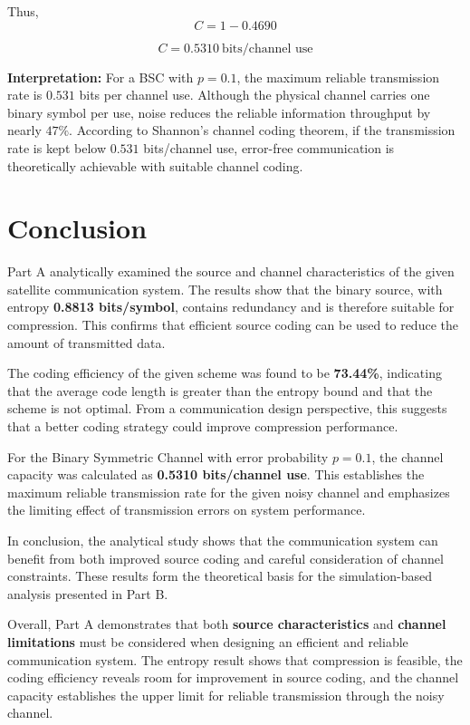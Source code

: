 \documentclass[12pt,a4paper]{article}
\begin{document}
Thus,
\[
C = 1 - 0.4690
\]

\[
\boxed{C = 0.5310\ \text{bits/channel use}}
\]

\begin{blueNote}
\textbf{Interpretation:} For a BSC with $p=0.1$, the maximum reliable transmission rate is $0.531$ bits per channel use. Although the physical channel carries one binary symbol per use, noise reduces the reliable information throughput by nearly $47\%$. According to Shannon's channel coding theorem, if the transmission rate is kept below $0.531$ bits/channel use, error-free communication is theoretically achievable with suitable channel coding.
\end{blueNote}

\section*{Conclusion}

Part A analytically examined the source and channel characteristics of the given satellite communication system. The results show that the binary source, with entropy \textbf{0.8813 bits/symbol}, contains redundancy and is therefore suitable for compression. This confirms that efficient source coding can be used to reduce the amount of transmitted data.

The coding efficiency of the given scheme was found to be \textbf{73.44\%}, indicating that the average code length is greater than the entropy bound and that the scheme is not optimal. From a communication design perspective, this suggests that a better coding strategy could improve compression performance.

For the Binary Symmetric Channel with error probability \textbf{$p = 0.1$}, the channel capacity was calculated as \textbf{0.5310 bits/channel use}. This establishes the maximum reliable transmission rate for the given noisy channel and emphasizes the limiting effect of transmission errors on system performance.

In conclusion, the analytical study shows that the communication system can benefit from both improved source coding and careful consideration of channel constraints. These results form the theoretical basis for the simulation-based analysis presented in Part B.

Overall, Part A demonstrates that both \textbf{source characteristics} and \textbf{channel limitations} must be considered when designing an efficient and reliable communication system. The entropy result shows that compression is feasible, the coding efficiency reveals room for improvement in source coding, and the channel capacity establishes the upper limit for reliable transmission through the noisy channel.
\end{document}
